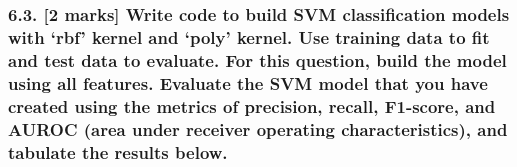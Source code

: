 \documentclass[11pt]{article}
\begin{document}
    \begin{center}
    \end{center}
    { \hspace*{\fill} \\}
    
    \begin{center}
    \end{center}
    { \hspace*{\fill} \\}
    
    \hypertarget{marks-write-code-to-build-svm-classification-models-with-rbf-kernel-and-poly-kernel.-use-training-data-to-fit-and-test-data-to-evaluate.-for-this-question-build-the-model-using-all-features.-evaluate-the-svm-model-that-you-have-created-using-the-metrics-of-precision-recall-f1-score-and-auroc-area-under-receiver-operating-characteristics-and-tabulate-the-results-below.}{%
\subsubsection{6.3. {[}2 marks{]} Write code to build SVM classification
models with `rbf' kernel and `poly' kernel. Use training data to fit and
test data to evaluate. For this question, build the model using all
features. Evaluate the SVM model that you have created using the metrics
of precision, recall, F1-score, and AUROC (area under receiver operating
characteristics), and tabulate the results
below.}\label{marks-write-code-to-build-svm-classification-models-with-rbf-kernel-and-poly-kernel.-use-training-data-to-fit-and-test-data-to-evaluate.-for-this-question-build-the-model-using-all-features.-evaluate-the-svm-model-that-you-have-created-using-the-metrics-of-precision-recall-f1-score-and-auroc-area-under-receiver-operating-characteristics-and-tabulate-the-results-below.}}
\end{document}
